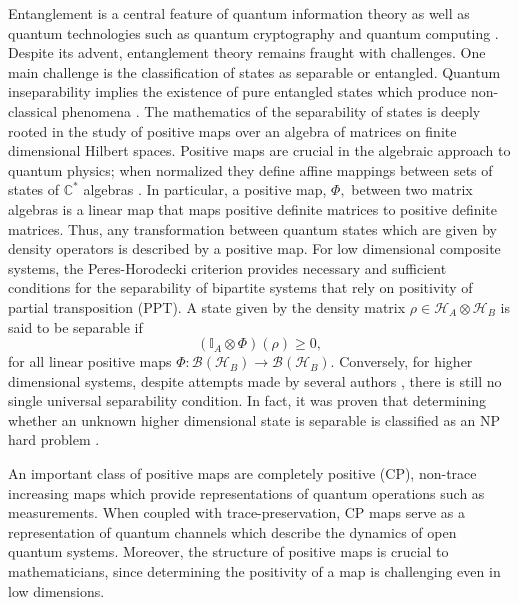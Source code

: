 \documentclass[11pt,reqno]{amsart}
\theoremstyle{definition}
\numberwithin{equation}{section} \setcounter{tocdepth}{1}
\numberwithin{equation}{section}
\begin{document}
Entanglement is a central feature of quantum information theory as well as quantum technologies such as quantum cryptography and quantum computing \cite{QIT}. Despite its advent, entanglement theory remains fraught with challenges. One main challenge is the classification of states as separable or entangled. Quantum inseparability implies the existence of pure entangled states which produce non-classical phenomena \cite{horodecki_necessary_1996}. The mathematics of the separability of states is deeply rooted in the study of positive maps over an algebra of matrices on finite dimensional Hilbert spaces. Positive maps are crucial in the algebraic approach to quantum physics; when normalized they define affine mappings between sets of states of $\mathbb{C}^*$ algebras \cite{BZ,chruscinski_entanglement_2014,BC24}. In particular, a positive map, $\Phi,$ between two matrix algebras is a linear map that maps positive definite matrices to positive definite matrices. Thus, any transformation between quantum states which are given by density operators is described by a positive map. For low dimensional\footnotemark{} composite systems, the Peres-Horodecki criterion provides necessary and sufficient conditions for the separability of bipartite systems that rely on positivity of partial transposition (PPT)\cite{horodecki_necessary_1996,peres_separability_1996,horodecki_information-theoretic_1996,horodecki_mixed-state_1998}. A state given by the density matrix $\rho \in \mathcal{H}_A \otimes \mathcal{H}_B$ is said to be separable if
\begin{equation}
   (\mathbb{I}_A \otimes \Phi)(\rho) \geq 0,
\end{equation} for all linear positive maps $\Phi: \mathcal{B}(\mathcal{H}_B) \rightarrow \mathcal{B}(\mathcal{H}_B)$. Conversely, for higher dimensional systems,  despite attempts made by several authors \cite{guhne_entanglement_2009, horodecki_quantum_2009}, there is still no single universal separability condition. In fact, it was proven that determining whether an unknown higher dimensional state is separable is classified as an NP hard problem \cite{gurvits_classical_2004}.



An important class of positive maps are completely positive (CP), non-trace increasing maps which provide representations of quantum operations such as measurements. When coupled with trace-preservation, CP maps serve as a representation of quantum channels which describe the dynamics of open quantum systems. Moreover, the structure of positive maps is crucial to mathematicians, since determining the positivity of a map is challenging even in low dimensions.
\end{document}

